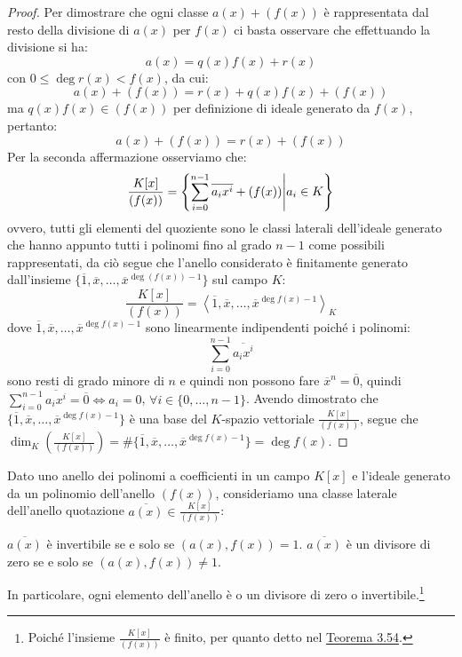 \documentclass[11pt]{scrartcl}
\begin{document}
\begin{proof}
Per dimostrare che ogni classe $a(x) + (f(x))$ è rappresentata dal resto della divisione di $a(x)$ per $f(x)$ ci basta osservare che effettuando la divisione si ha:
	\[ a(x) = q(x)f(x)+r(x)
	\]
con $ 0 \leq \deg r(x) < f(x)$, da cui:
	\[ a(x) + (f(x)) = r(x) + q(x)f(x) + (f(x))
	\]
ma $q(x)f(x) \in (f(x))$ per definizione di ideale generato da $f(x)$, pertanto:
	\[ a(x) + (f(x)) = r(x) + (f(x))
	\]
Per la seconda affermazione osserviamo che:
	\[ \frac{K[x]}{(f(x))} = \left\{\sum_{i=0}^{n-1} \overline{a_ix^i} + (f(x)) \middle| a_i \in K\right\}
	\]
ovvero, tutti gli elementi del quoziente sono le classi laterali dell'ideale generato che hanno appunto tutti i polinomi fino al grado $n-1$ come possibili rappresentati,
da ciò segue che l'anello considerato è finitamente generato dall'insieme $\{\overline 1, \overline x, \ldots , \overline{x}^{\deg(f(x))-1}\}$ sul campo $K$:
	\[   \frac{K[x]}{(f(x))} = \left<\overline 1, \overline x, \ldots , \overline{x}^{\deg f(x)-1}\right>_K
	\]
dove $\overline 1, \overline x, \ldots , \overline{x}^{\deg f(x) -1}$ sono linearmente indipendenti poiché i polinomi:
	\[ \sum_{i=0}^{n-1} \overline{a_ix^i}
	\]
sono resti di grado minore di $n$ e quindi non possono fare $\overline{x}^n = \overline{0}$, quindi $\sum_{i=0}^{n-1} \overline{a_ix^i} = \overline 0 \iff a_i = 0$, $\forall i \in \{0,\ldots,n-1\}$. 
Avendo dimostrato che $\{\overline 1, \overline x, \ldots , \overline{x}^{\deg f(x)-1}\}$ è una base del $K$-spazio vettoriale $\frac{K[x]}{(f(x))}$,
segue che $\dim_K\left(\frac{K[x]}{(f(x))}\right) = \#\{\overline 1, \overline x, \ldots , \overline{x}^{\deg f(x)-1}\} = \deg f(x)$.
\end{proof}

\begin{proposition}
\label{p:3.54}
Dato uno anello dei polinomi a coefficienti in un campo $K[x]$ e l'ideale generato da un polinomio dell'anello $(f(x))$, consideriamo una classe laterale
dell'anello quotazione $\overline{a(x)} \in \frac{K[x]}{(f(x))}$:
	\begin{enumerate}[(1)]
	\ii $\overline{a(x)}$ è invertibile se e solo se $(a(x),f(x)) = 1$.
	\ii $\overline{a(x)}$ è un divisore di zero se e solo se $(a(x),f(x)) \ne 1$.
	\end{enumerate}
In particolare, ogni elemento dell'anello è o un divisore di zero o invertibile.\footnote{Poiché l'insieme $\frac{K[x]}{(f(x))}$ è finito, per quanto detto nel \hyperref[p:3.53]{Teorema 3.54}.}
\end{proposition}
\end{document}
